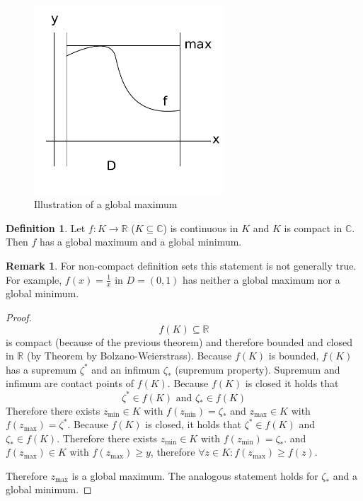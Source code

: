 \documentclass[a4paper,landscape,twocolumn]{article}
\theoremstyle{definition}
\newtheorem{defi}{Definition}
\newtheorem{rem}{Remark}
\begin{document}
\begin{figure}[!h]
  \begin{center}
    \includegraphics[width=200pt]{img/global_maximum.pdf}
    \caption{Illustration of a global maximum}
  \end{center}
\end{figure}

\begin{defi}
  Let $f: K \rightarrow \mathbb R$ ($K \subseteq \mathbb C$) is continuous in $K$
  and $K$ is compact in $\mathbb C$. Then $f$ has a global maximum and a global
  minimum.
\end{defi}

\begin{rem}
  For non-compact definition sets this statement is not generally true.
  For example, $f(x) = \frac1x$ in $D = (0, 1)$ has neither a global maximum
  nor a global minimum.
\end{rem}
\begin{proof}
  \[ f(K) \subseteq \mathbb R \]
  is compact (because of the previous theorem) and therefore bounded and
  closed in $\mathbb R$ (by Theorem by Bolzano-Weierstrass).
  Because $f(K)$ is bounded, $f(K)$ has a supremum $\zeta^*$ and an infimum $\zeta_*$
  (supremum property). Supremum and infimum are contact points of $f(K)$.
  Because $f(K)$ is closed it holds that
  \[ \zeta^* \in f(K) \text{ and } \zeta_* \in f(K) \]
  Therefore there exists $z_{\text{min}} \in K$ with $f(z_{\text{min}}) = \zeta_*$
  and $z_{\text{max}} \in K$ with $f(z_{\text{max}}) = \zeta^*$.
  Because $f(K)$ is closed, it holds that $\zeta^* \in f(K)$ and $\zeta_* \in f(K)$.
  Therefore there exists $z_{\text{min}} \in K$ with $f(z_{\text{min}}) = \zeta_*$.
  and $f(z_{\text{max}}) \in K$ with $f(z_{\text{max}}) \geq y$, therefore
  $\forall z \in K: f(z_{\text{max}}) \geq f(z)$.

  Therefore $z_{\text{max}}$ is a global maximum. The analogous statement holds
  for $\zeta_*$ and a global minimum.
\end{proof}
\end{document}
